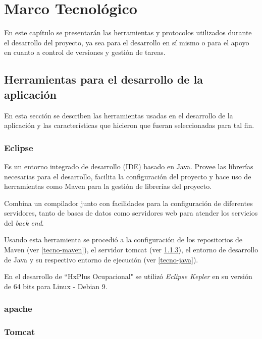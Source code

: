 \chapter{Marco Tecnológico}

En este capítulo se presentarán las herramientas y protocolos utilizados durante el desarrollo del proyecto, ya sea para el desarrollo en sí mismo o para el apoyo en cuanto a control de versiones y gestión de tareas.

    \section{Herramientas para el desarrollo de la aplicación}
    
    En esta sección se describen las herramientas usadas en el desarrollo de la aplicación y las características que hicieron que fueran seleccionadas para tal fin.
    
        \subsection{Eclipse}
        \label{tecno-eclipse}
        
        Es un entorno integrado de desarrollo (IDE) basado en Java. Provee las librerías necesarias para el desarrollo, facilita la configuración del proyecto y hace uso de herramientas como Maven para la gestión de librerías del proyecto.
        
        Combina un compilador junto con facilidades para la configuración de diferentes servidores, tanto de bases de datos como servidores web para atender los servicios del \textit{back end}.
        
        Usando esta herramienta se procedió a la configuración de los repositorios de Maven (ver \ref{tecno-maven}), el servidor tomcat (ver \ref{tecno-tomcat}), el entorno de desarrollo de Java y su respectivo entorno de ejecución (ver \ref{tecno-java}).
        
        En el desarrollo de ``HxPlus Ocupacional" se utilizó \textit{Eclipse Kepler} en su versión de 64 bits para Linux - Debian 9.
        
        \subsection{apache}
        \label{tecno-apache}
        
        \subsection{Tomcat}
        \label{tecno-tomcat}
    
